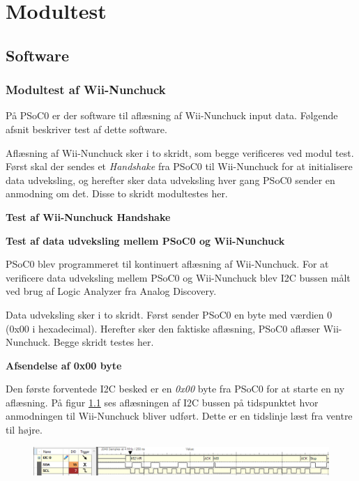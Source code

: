 \chapter{Modultest}

\section{Software}

\subsection{Modultest af Wii-Nunchuck}
På PSoC0 er der software til aflæsning af Wii-Nunchuck input data. Følgende afsnit beskriver test af dette software.

Aflæsning af Wii-Nunchuck sker i to skridt, som begge verificeres ved modul test. Først skal der sendes et \textit{Handshake} fra PSoC0 til Wii-Nunchuck for at initialisere data udveksling, og herefter sker data udveksling hver gang PSoC0 sender en anmodning om det. Disse to skridt modultestes her.

\textbf{Test af Wii-Nunchuck Handshake}

\textbf{Test af data udveksling mellem PSoC0 og Wii-Nunchuck} 

PSoC0 blev programmeret til kontinuert aflæsning af Wii-Nunchuck. For at verificere data udveksling mellem PSoC0 og Wii-Nunchuck blev I2C bussen målt ved brug af Logic Analyzer fra Analog Discovery.

Data udveksling sker i to skridt. Først sender PSoC0 en byte med værdien 0 (0x00 i hexadecimal). Herefter sker den faktiske aflæsning, PSoC0 aflæser Wii-Nunchuck. Begge skridt testes her.

\textbf{Afsendelse af 0x00 byte}

Den første forventede I2C besked er en \textit{0x00} byte fra PSoC0 for at starte en ny aflæsning. På figur \ref{fig:NunchuckWriteValues} ses aflæsningen af I2C bussen på tidspunktet hvor anmodningen til Wii-Nunchuck bliver udført. Dette er en tidslinje læst fra ventre til højre.

\begin{figure}[H]
	\centering
	\includegraphics[width=\textwidth]{Test/images/writerequest}
	\caption{}
	\label{fig:NunchuckWriteValues}
\end{figure}

